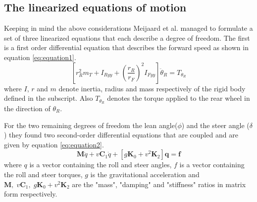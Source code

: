 \subsection{The linearized equations of motion}
Keeping in mind the above considerations Meijaard et al.\cite{meijaard2007linearized} managed to formulate a set of three linearized equations that each describe a degree of freedom. The first is a first order differential equation that describes the forward speed as shown in equation \ref{eq:equation1}\cite{meijaard2007linearized}.
\begin{equation}
    \left[r_{R}^{2} m_{T}+I_{R y y}+\left(\frac{r_{R}}{r_{F}}\right)^{2} I_{F y y}\right] \ddot{\theta}_{R}=T_{\theta_{R}}
    \label{eq:equation1}
\end{equation}
where \ensuremath{I}, \ensuremath{r} and \ensuremath{m} denote inertia, radius and mass respectively of the rigid body defined in the subscript. Also \ensuremath{T_{\theta_{R}}} denotes the torque applied to the rear wheel in the direction of \ensuremath{\theta_{R}}.
\par
For the two remaining degrees of freedom the lean angle(\ensuremath{\phi}) and the steer angle (\ensuremath{\delta}) they found two second-order differential equations that are coupled and are given by equation \ref{eq:equation2}\cite{meijaard2007linearized}.
\begin{equation}
    \mathbf{M} \ddot{q}+v \mathbf{C}_{1} \dot{q}+\left[g \mathbf{K}_{0}+v^{2} \mathbf{K}_{2}\right] \mathbf{q}=\mathbf{f}
    \label{eq:equation2}
\end{equation}
where \ensuremath{q} is a vector containing the roll and steer angles, \ensuremath{f} is a vector containing the roll and steer torques, \ensuremath{g} is the gravitational acceleration and \ensuremath{\mathbf{M},\;v\mathbf{C}_{1},\;g \mathbf{K}_{0}+v^{2} \mathbf{K}_{2}} are the "mass", "damping" and "stiffness" ratios in matrix form respectively.

